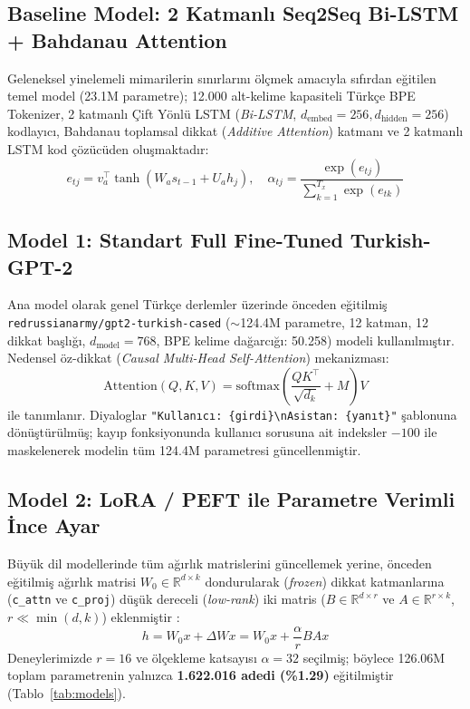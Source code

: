 \documentclass[conference]{IEEEtran}
\begin{document}
\subsection{Baseline Model: 2 Katmanlı Seq2Seq Bi-LSTM + Bahdanau Attention}
Geleneksel yinelemeli mimarilerin sınırlarını ölçmek amacıyla sıfırdan eğitilen temel model (23.1M parametre); 12.000 alt-kelime kapasiteli Türkçe BPE Tokenizer, 2 katmanlı Çift Yönlü LSTM (\textit{Bi-LSTM}, $d_{\text{embed}}=256, d_{\text{hidden}}=256$) kodlayıcı, Bahdanau toplamsal dikkat (\textit{Additive Attention}) katmanı ve 2 katmanlı LSTM kod çözücüden oluşmaktadır:
\begin{equation}
    e_{tj} = v_a^\top \tanh(W_a s_{t-1} + U_a h_j), \quad \alpha_{tj} = \frac{\exp(e_{tj})}{\sum_{k=1}^{T_x} \exp(e_{tk})}
\end{equation}

\subsection{Model 1: Standart Full Fine-Tuned Turkish-GPT-2}
Ana model olarak genel Türkçe derlemler üzerinde önceden eğitilmiş \texttt{redrussianarmy/gpt2-turkish-cased} ($\sim$124.4M parametre, 12 katman, 12 dikkat başlığı, $d_{\text{model}}=768$, BPE kelime dağarcığı: 50.258) modeli kullanılmıştır. Nedensel öz-dikkat (\textit{Causal Multi-Head Self-Attention}) mekanizması:
\begin{equation}
    \text{Attention}(Q, K, V) = \text{softmax}\left(\frac{QK^\top}{\sqrt{d_k}} + M\right)V
\end{equation}
ile tanımlanır. Diyaloglar \texttt{"Kullanıcı: \{girdi\}\textbackslash nAsistan: \{yanıt\}"} şablonuna dönüştürülmüş; kayıp fonksiyonunda kullanıcı sorusuna ait indeksler $-100$ ile maskelenerek modelin tüm 124.4M parametresi güncellenmiştir.

\subsection{Model 2: LoRA / PEFT ile Parametre Verimli İnce Ayar}
Büyük dil modellerinde tüm ağırlık matrislerini güncellemek yerine, önceden eğitilmiş ağırlık matrisi $W_0 \in \mathbb{R}^{d \times k}$ dondurularak (\textit{frozen}) dikkat katmanlarına (\texttt{c\_attn} ve \texttt{c\_proj}) düşük dereceli (\textit{low-rank}) iki matris ($B \in \mathbb{R}^{d \times r}$ ve $A \in \mathbb{R}^{r \times k}$, $r \ll \min(d,k)$) eklenmiştir \cite{hu2022lora}:
\begin{equation}
    h = W_0 x + \Delta W x = W_0 x + \frac{\alpha}{r} B A x
\end{equation}
Deneylerimizde $r=16$ ve ölçekleme katsayısı $\alpha=32$ seçilmiş; böylece 126.06M toplam parametrenin yalnızca \textbf{1.622.016 adedi (\%1.29)} eğitilmiştir (Tablo~\ref{tab:models}).
\end{document}
